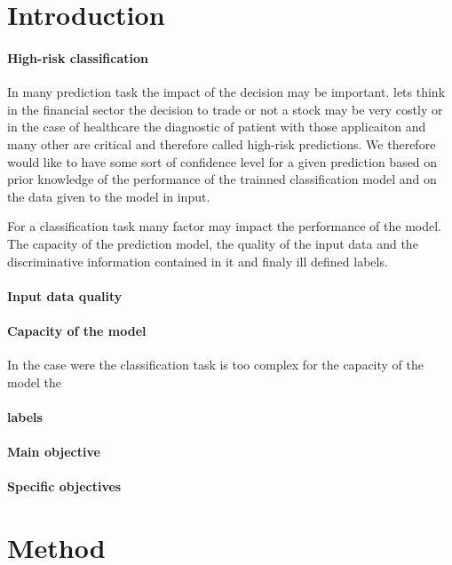 \documentclass[authoryear]{elsarticle}
\begin{document}
\section{Introduction}
\paragraph{High-risk classification}
In many prediction task the impact of the decision may be important. lets think in the financial sector the decision to trade or not a stock may be very costly or in the case of healthcare the diagnostic of patient with  those applicaiton and many other are critical and therefore called high-risk predictions. We therefore would like to have some sort of confidence level for a given prediction based on prior knowledge of the performance of the trainned classification model and on the data given to the model in input.

For a classification task many factor may impact the performance of the model. The capacity of the prediction model, the quality of the input data and the discriminative information contained in it and finaly  ill defined labels.
\paragraph{Input data quality}
\paragraph{Capacity of the model}
In the case were the classification task is too complex for the capacity of the model the 

\paragraph{labels}

\paragraph{Main objective}


\paragraph{Specific objectives}

\section{Method}
\end{document}

